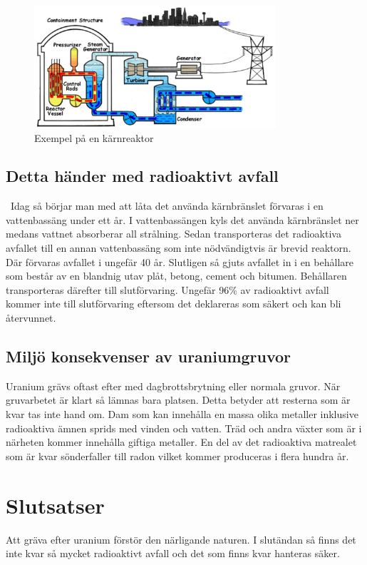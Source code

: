 \documentclass[11p]{article}
\begin{document}
    \begin{figure}
        \includegraphics[width=0.8\textwidth]{../images/powerplant.jpg}
        \caption{Exempel på en kärnreaktor\parencite{figur2}}
        \label{fig:powerplant}
    \end{figure}
\newpage
    \subsection{Detta händer med radioaktivt avfall}\
Idag så börjar man med att låta det använda kärnbränslet förvaras i en vattenbassäng under ett år.
    I vattenbassängen kyls det använda kärnbränslet ner medans vattnet absorberar all strålning.
    Sedan transporteras det radioaktiva avfallet till en annan vattenbassäng som inte nödvändigtvis är brevid reaktorn.
    Där förvaras avfallet i ungefär 40 år.
    Slutligen så gjuts avfallet in i en behållare som består av en blandnig utav plåt, betong, cement och bitumen.
    Behållaren transporteras därefter till slutförvaring.\parencite{storage}
    Ungefär 96\% av radioaktivt avfall kommer inte till slutförvaring eftersom det deklareras som säkert och kan bli återvunnet.\parencite{recycle}

    \subsection{Miljö konsekvenser av uraniumgruvor}
    Uranium grävs oftast efter med dagbrottsbrytning eller normala gruvor.
    När gruvarbetet är klart så lämnas bara platsen.
    Detta betyder att resterna som är kvar tas inte hand om.
    Dam som kan innehålla en massa olika metaller inklusive radioaktiva ämnen sprids med vinden och vatten.
    Träd och andra växter som är i närheten kommer innehålla giftiga metaller.
    En del av det radioaktiva matrealet som är kvar sönderfaller till radon vilket kommer produceras i flera hundra år.\parencite{mining}

    \section{Slutsatser}

    Att gräva efter uranium förstör den närligande naturen.
    I slutändan så finns det inte kvar så mycket radioaktivt avfall och det som finns kvar hanteras säker.

    \printbibliography
\end{document}
